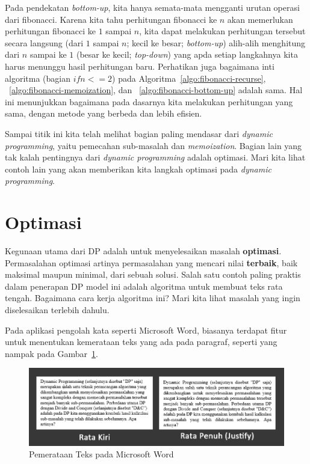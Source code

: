 Pada pendekatan \textit{bottom-up}, kita hanya semata-mata mengganti urutan operasi dari fibonacci. Karena kita tahu perhitungan fibonacci ke $n$ akan memerlukan perhitungan fibonacci ke $1$ sampai $n$, kita dapat melakukan perhitungan tersebut secara langsung (dari $1$ sampai $n$; kecil ke besar; \textit{bottom-up}) alih-alih menghitung dari $n$ sampai ke $1$ (besar ke kecil; \textit{top-down}) yang apda setiap langkahnya kita harus menunggu hasil perhitungan baru. Perhatikan juga bagaimana inti algoritma (bagian $if n <= 2$) pada Algoritma~\ref{algo:fibonacci-recurse}, ~\ref{algo:fibonacci-memoization}, dan ~\ref{algo:fibonacci-bottom-up} adalah sama. Hal ini menunjukkan bagaimana pada dasarnya kita melakukan perhitungan yang sama, dengan metode yang berbeda dan lebih efisien.

Sampai titik ini kita telah melihat bagian paling mendasar dari \textit{dynamic programming}, yaitu pemecahan sub-masalah dan \textit{memoization}. Bagian lain yang tak kalah pentingnya dari \textit{dynamic programming} adalah optimasi. Mari kita lihat contoh lain yang akan memberikan kita langkah optimasi pada \textit{dynamic programming}.

\section{Optimasi}

Kegunaan utama dari DP adalah untuk menyelesaikan masalah \textbf{optimasi}. Permasalahan optimasi artinya permasalahan yang mencari nilai \textbf{terbaik}, baik maksimal maupun minimal, dari sebuah solusi. Salah satu contoh paling praktis dalam penerapan DP model ini adalah algoritma untuk membuat teks rata tengah. Bagaimana cara kerja algoritma ini? Mari kita lihat masalah yang ingin diselesaikan terlebih dahulu.

Pada aplikasi pengolah kata seperti Microsoft Word, biasanya terdapat fitur untuk menentukan kemerataan teks yang ada pada paragraf, seperti yang nampak pada Gambar~\ref{fig:text-align}.

\begin{figure}
    \includegraphics[width=\textwidth,keepaspectratio]{fig/TextAlign}
	\caption{Pemerataan Teks pada Microsoft Word}
	\label{fig:text-align}
\end{figure}

